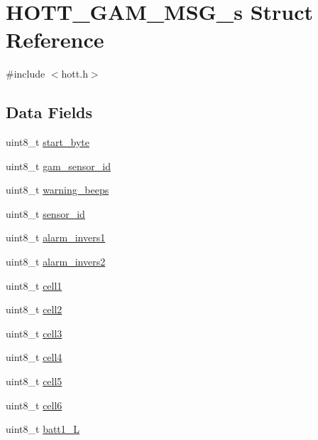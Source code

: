 \hypertarget{structHOTT__GAM__MSG__s}{\section{H\+O\+T\+T\+\_\+\+G\+A\+M\+\_\+\+M\+S\+G\+\_\+s Struct Reference}
\label{structHOTT__GAM__MSG__s}
}


{\ttfamily \#include $<$hott.\+h$>$}

\subsection*{Data Fields}
\begin{DoxyCompactItemize}
\item 
uint8\+\_\+t \hyperlink{structHOTT__GAM__MSG__s_ad86f6f3e6a3a3a465c3e765292eadc53}{start\+\_\+byte}
\item 
uint8\+\_\+t \hyperlink{structHOTT__GAM__MSG__s_af317cfc0486e3c1487a15412a3027746}{gam\+\_\+sensor\+\_\+id}
\item 
uint8\+\_\+t \hyperlink{structHOTT__GAM__MSG__s_a0c1a86d48ead98a7eaf5bdd38eedc6dc}{warning\+\_\+beeps}
\item 
uint8\+\_\+t \hyperlink{structHOTT__GAM__MSG__s_ae936a24e3e0550857333c088d9fe4eab}{sensor\+\_\+id}
\item 
uint8\+\_\+t \hyperlink{structHOTT__GAM__MSG__s_af2e9cf0c0818f577dc49201e19f28915}{alarm\+\_\+invers1}
\item 
uint8\+\_\+t \hyperlink{structHOTT__GAM__MSG__s_af2ed3899289a2b377c574bdb57295865}{alarm\+\_\+invers2}
\item 
uint8\+\_\+t \hyperlink{structHOTT__GAM__MSG__s_a9b6ec05cd04a400d1a4abba480b21198}{cell1}
\item 
uint8\+\_\+t \hyperlink{structHOTT__GAM__MSG__s_a08c35c0f3468c9238c8621fda18ecb16}{cell2}
\item 
uint8\+\_\+t \hyperlink{structHOTT__GAM__MSG__s_af92227941b24e07fba952a5db0eed1fb}{cell3}
\item 
uint8\+\_\+t \hyperlink{structHOTT__GAM__MSG__s_a1c71e2ba297570f727c927536dfa6324}{cell4}
\item 
uint8\+\_\+t \hyperlink{structHOTT__GAM__MSG__s_a5109e48afa3346ee754638f6a7611d97}{cell5}
\item 
uint8\+\_\+t \hyperlink{structHOTT__GAM__MSG__s_adc800983f5aeb822c2dcba43b1de23ba}{cell6}
\item 
uint8\+\_\+t \hyperlink{structHOTT__GAM__MSG__s_add5b3329be581a089f603bcaacec7dbd}{batt1\+\_\+\+L}

\end{DoxyCompactItemize}
